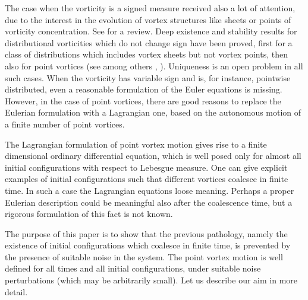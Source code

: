 \documentclass[11pt,a4paper]{article}%
\begin{document}
The case when the vorticity is a signed measure received also a lot
of attention, due to the interest in the evolution of vortex
structures like sheets or points of vorticity concentration. See
\cite{MajdaBert} for a review. Deep existence and stability results
for distributional   vorticities which do  not change sign have
been proved, first for a class of distributions which includes
vortex sheets but not vortex points, then also for point vortices
 (see among others \cite{Delhort}, \cite{Poup}). Uniqueness is an open
problem in all such cases. When the vorticity has variable sign and
is, for instance, pointwise distributed, even a reasonable
formulation of the Euler equations is missing. However, in the case
of point vortices, there are good reasons to replace the Eulerian
formulation with a Lagrangian one, based on the autonomous motion of
a finite number of point vortices.

The Lagrangian formulation of point vortex motion gives rise to a
finite dimensional ordinary differential equation, which is well
posed only for almost all initial configurations with respect to
Lebesgue measure. One can give explicit examples of initial
configurations such that different vortices coalesce in finite time.
In such a case the Lagrangian equations loose meaning. Perhaps a
proper Eulerian description could be meaningful also after the
coalescence time, but a rigorous formulation of this fact is not
known.

The purpose of this paper is to show that the previous pathology, namely the
existence of initial configurations which coalesce in finite time, is
prevented by the presence of suitable noise in the system. The point vortex
motion is well defined for all times and all initial configurations, under
suitable noise perturbations (which may be arbitrarily small). Let us describe
our aim in more detail.
\end{document}
